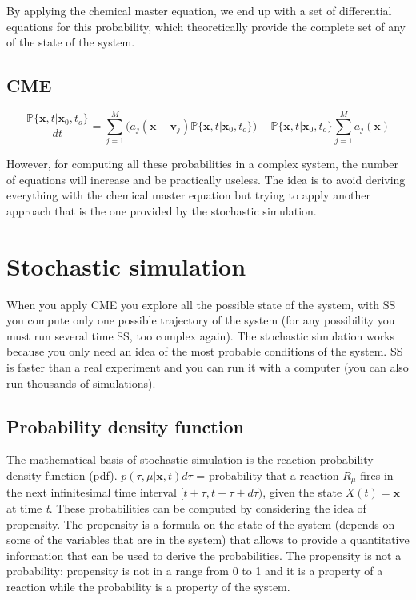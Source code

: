 By applying the chemical master equation, we end up with a set of
differential equations for this probability, which theoretically provide
the complete set of any of the state of the system.

\hypertarget{cme}{%
\subsection{CME}\label{cme}}

$$
\frac{\mathbb{P} \{\mathbf{x},t|\mathbf{x}_0,t_o\}}{dt} = \sum_{j=1}^{M}(a_j(\mathbf{x}-\mathbf{v}_j)\mathbb{P} \{\mathbf{x},t|\mathbf{x}_0,t_o\})- \mathbb{P} \{\mathbf{x},t|\mathbf{x}_0,t_o\} \sum^M_{j=1} a_j(\mathbf{x})
$$

However, for computing all these probabilities in a complex system, the
number of equations will increase and be practically useless. The idea
is to avoid deriving everything with the chemical master equation but
trying to apply another approach that is the one provided by the
stochastic simulation.

\hypertarget{stochastic-simulation}{%
\section{Stochastic simulation}\label{stochastic-simulation}}

When you apply CME you explore all the possible state of the system,
with SS you compute only one possible trajectory of the system (for any
possibility you must run several time SS, too complex again). The
stochastic simulation works because you only need an idea of the most
probable conditions of the system. SS is faster than a real experiment
and you can run it with a computer (you can also run thousands of
simulations).

\hypertarget{probability-density-function}{%
\subsection{Probability density
function}\label{probability-density-function}}

The mathematical basis of stochastic simulation is the reaction
probability density function (pdf). $p(\tau, \mu |\mathbf{x}, t)d\tau$ =
probability that a reaction $R_\mu$ fires in the next infinitesimal
time interval $[t+\tau,t+\tau+d\tau)$, given the state
$X(t) = \mathbf{x}$ at time \emph{t}. These probabilities can be
computed by considering the idea of propensity. The propensity is a
formula on the state of the system (depends on some of the variables
that are in the system) that allows to provide a quantitative
information that can be used to derive the probabilities. The propensity
is not a probability: propensity is not in a range from 0 to 1 and it is
a property of a reaction while the probability is a property of the
system.

